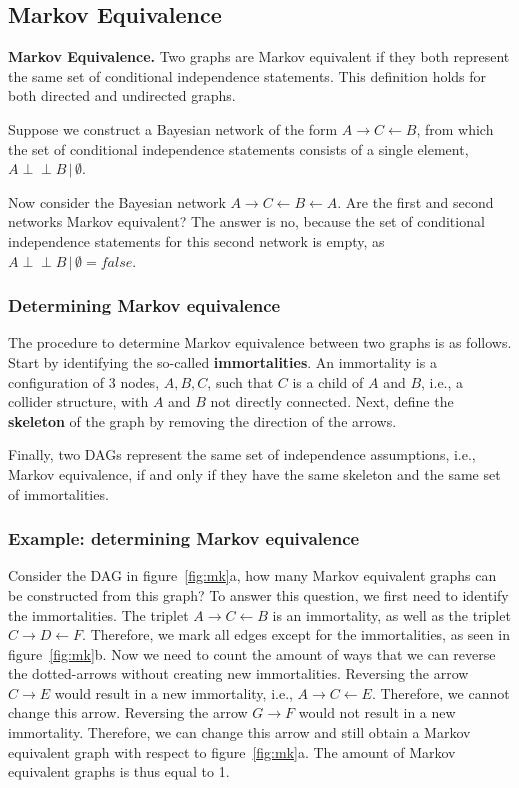\documentclass{article}
\newcommand{\indep}{\perp \!\!\! \perp}
\begin{document}
\subsection{Markov Equivalence}

\begin{theorem}
    \textbf{Markov Equivalence.} Two graphs are Markov equivalent if they both represent the same set of conditional independence statements. This definition holds for both directed and undirected graphs. 
\end{theorem}

\noindent Suppose we construct a Bayesian network of the form $A \rightarrow C \leftarrow B$, from which the set of conditional independence statements consists of a single element, $A \indep B \,|\, \emptyset$. 

Now consider the Bayesian network $A \rightarrow C \leftarrow B \leftarrow A$. Are the first and second networks Markov equivalent? The answer is no, because the set of conditional independence statements for this second network is empty, as $A \indep B \,|\, \emptyset = false$.

\subsubsection{Determining Markov equivalence}

The procedure to determine Markov equivalence between two graphs is as follows. Start by identifying the so-called \textbf{immortalities}. An immortality is a configuration of 3 nodes, $A, B, C$, such that $C$ is a child of $A$ and $B$, i.e., a collider structure, with $A$ and $B$ not directly connected. Next, define the \textbf{skeleton} of the graph by removing the direction of the arrows. 

Finally, two DAGs represent the same set of independence assumptions, i.e., Markov equivalence, if and only if they have the same skeleton and the same set of immortalities. 

\subsubsection{Example: determining Markov equivalence}

Consider the DAG in figure~\ref{fig:mk}a, how many Markov equivalent graphs can be constructed from this graph? To answer this question, we first need to identify the immortalities. The triplet $A \rightarrow C \leftarrow B$ is an immortality, as well as the triplet $C \rightarrow D \leftarrow F$. Therefore, we mark all edges except for the immortalities, as seen in figure~\ref{fig:mk}b. Now we need to count the amount of ways that we can reverse the dotted-arrows without creating new immortalities. Reversing the arrow $C \rightarrow E$ would result in a new immortality, i.e., $A \rightarrow C \leftarrow E$. Therefore, we cannot change this arrow. Reversing the arrow $G \rightarrow F$ would not result in a new immortality. Therefore, we can change this arrow and still obtain a Markov equivalent graph with respect to figure~\ref{fig:mk}a. The amount of Markov equivalent graphs is thus equal to 1.
\end{document}
